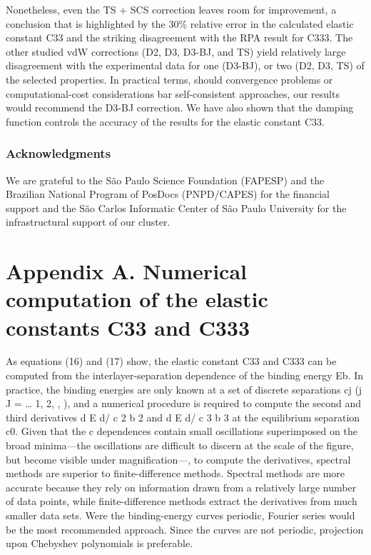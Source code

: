 \documentclass{article}
\begin{document}
Nonetheless, even the TS + SCS correction leaves room for improvement, a conclusion that is highlighted by the 30\% relative error in the calculated elastic constant C33 and the striking disagreement with the RPA result for C333. The other studied vdW corrections (D2, D3, D3-BJ, and TS) yield relatively large disagreement with the experimental data for one (D3-BJ), or two (D2, D3, TS) of the selected properties. In practical terms, should convergence problems or computational-cost considerations bar self-consistent approaches, our results would recommend the D3-BJ correction. We have also shown that the damping function controls the accuracy of the results for the elastic constant C33.

\subsubsection{\textbf{Acknowledgments}}

We are grateful to the São Paulo Science Foundation (FAPESP) and the Brazilian National Program of PosDocs (PNPD/CAPES) for the financial support and the São Carlos Informatic Center of São Paulo University for the infrastructural support of our cluster.

\section{\textbf{Appendix A. Numerical computation of the elastic constants} C\textbf{33 and} C333}

As equations (16) and (17) show, the elastic constant C33 and C333 can be computed from the interlayer-separation dependence of the binding energy Eb. In practice, the binding energies are only known at a set of discrete separations cj (j J = … 1, 2, , ), and a numerical procedure is required to compute the second and third derivatives d E d/ c 2 b 2 and d E d/ c 3 b 3 at the equilibrium separation c0. Given that the c dependences contain small oscillations superimposed on the broad minima—the oscillations are difficult to discern at the scale of the figure, but become visible under magnification—, to compute the derivatives, spectral methods are superior to finite-difference methods. Spectral methods are more accurate because they rely on information drawn from a relatively large number of data points, while finite-difference methods extract the derivatives from much smaller data sets. Were the binding-energy curves periodic, Fourier series would be the most recommended approach. Since the curves are not periodic, projection upon Chebyshev polynomials is preferable.
\end{document}
